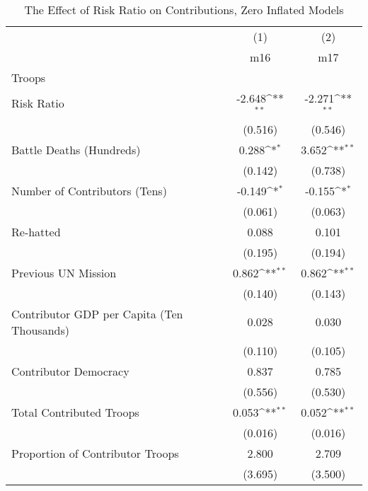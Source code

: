 \begin{table}[htbp]\centering
\def\sym#1{\ifmmode^{#1}\else\(^{#1}\)\fi}
\caption{The Effect of Risk Ratio on Contributions, Zero Inflated Models}
\begin{tabular}{l*{2}{c}}
\hline\hline
                    &\multicolumn{1}{c}{(1)}        &\multicolumn{1}{c}{(2)}        \\
                    &         m16        &         m17        \\
\hline
Troops              &                    &                    \\
Risk Ratio          &      -2.648\sym{**}&      -2.271\sym{**}\\
                    &     (0.516)        &     (0.546)        \\
[1em]
Battle Deaths (Hundreds)&       0.288\sym{*} &       3.652\sym{**}\\
                    &     (0.142)        &     (0.738)        \\
[1em]
Number of Contributors (Tens)&      -0.149\sym{*} &      -0.155\sym{*} \\
                    &     (0.061)        &     (0.063)        \\
[1em]
Re-hatted           &       0.088        &       0.101        \\
                    &     (0.195)        &     (0.194)        \\
[1em]
Previous UN Mission &       0.862\sym{**}&       0.862\sym{**}\\
                    &     (0.140)        &     (0.143)        \\
[1em]
Contributor GDP per Capita (Ten Thousands)&       0.028        &       0.030        \\
                    &     (0.110)        &     (0.105)        \\
[1em]
Contributor Democracy&       0.837        &       0.785        \\
                    &     (0.556)        &     (0.530)        \\
[1em]
Total Contributed Troops&       0.053\sym{**}&       0.052\sym{**}\\
                    &     (0.016)        &     (0.016)        \\
[1em]
Proportion of Contributor Troops&       2.800        &       2.709        \\
                    &     (3.695)        &     (3.500)        \\

\end{tabular}
\end{table}
